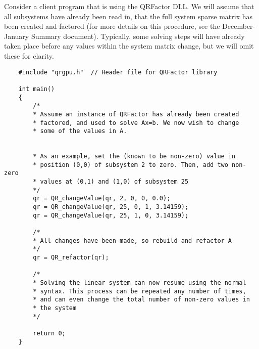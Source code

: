 \documentclass[11pt,letterpaper]{article}
\begin{document}
Consider a client program that is using the QRFactor DLL. We will assume that all subsystems have already been read in, that the full system sparse matrix has been created and factored (for more details on this procedure, see the December-January Summary document). Typically, some solving steps will have already taken place before any values within the system matrix change, but we will omit these for clarity.

\begin{verbatim}
    #include "qrgpu.h"  // Header file for QRFactor library

    int main()
    {
        /*
        * Assume an instance of QRFactor has already been created
        * factored, and used to solve Ax=b. We now wish to change 
        * some of the values in A. 

        
        * As an example, set the (known to be non-zero) value in
        * position (0,0) of subsystem 2 to zero. Then, add two non-zero
        * values at (0,1) and (1,0) of subsystem 25
        */
        qr = QR_changeValue(qr, 2, 0, 0, 0.0);
        qr = QR_changeValue(qr, 25, 0, 1, 3.14159);
        qr = QR_changeValue(qr, 25, 1, 0, 3.14159);

        /*
        * All changes have been made, so rebuild and refactor A
        */
        qr = QR_refactor(qr);
        
        /*
        * Solving the linear system can now resume using the normal
        * syntax. This process can be repeated any number of times,
        * and can even change the total number of non-zero values in 
        * the system
        */

        return 0;
    }
\end{verbatim}

\end{document}
